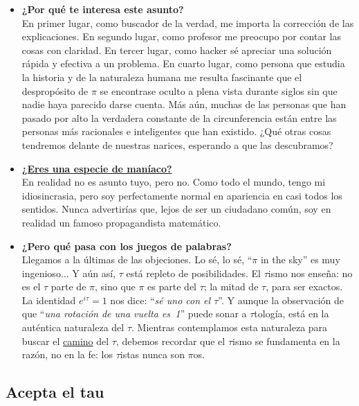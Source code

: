 \begin{itemize}
  \item \textbf{¿Por qué te interesa este asunto?} \\ En primer lugar, como buscador de la verdad, me importa la corrección de las explicaciones. En segundo lugar, como profesor me preocupo por contar las cosas con claridad. En tercer lugar, como hacker sé apreciar una solución rápida y efectiva a un problema. En cuarto lugar, como persona que estudia la historia y de la naturaleza humana me resulta fascinante que el despropósito de $\pi$ se encontrase oculto a plena vista durante siglos sin que nadie haya parecido darse cuenta. Más aún, muchas de las personas que han pasado por alto la verdadera constante de la circunferencia están entre las personas más racionales e inteligentes que han existido. ¿Qué otras cosas tendremos delante de nuestras narices, esperando a que las descubramos?


  \item \href{https://youtube.com/clip/UgkxgkaP4J9lCZ8Yjd7Fe9iLGDHYfd9anfR1}{\textbf{¿Eres una especie de maníaco?}} \\ En realidad no es asunto tuyo, pero no. Como todo el mundo, tengo mi idiosincrasia, pero soy perfectamente normal en apariencia en casi todos los sentidos. Nunca advertirías que, lejos de ser un ciudadano común, soy en realidad un famoso propagandista matemático.


  \item \textbf{¿Pero qué pasa con los juegos de palabras?} \\ Llegamos a la últimas de las objeciones. Lo sé, lo sé, ``$\pi$ in the sky'' es muy ingenioso$\ldots$ Y aún así, $\tau$ está repleto de posibilidades. El $\tau$ismo nos enseña: no es el $\tau$ parte de $\pi$, sino que $\pi$ es parte del $\tau$; la mitad de $\tau$, para ser exactos. La identidad $e^{i\tau} = 1$ nos dice: ``\emph{sé uno con el $\tau$}''. Y aunque la observación de que ``\emph{una rotación de una vuelta es~1}'' puede sonar a $\tau$tología, está en la auténtica naturaleza del $\tau$. Mientras contemplamos esta naturaleza para buscar el \href{https://es.wikipedia.org/wiki/Tao}{camino} del $\tau$, debemos recordar que el $\tau$ismo se fundamenta en la razón, no en la fe: los $\tau$istas nunca son $\pi$os.


\end{itemize}


  \subsection{Acepta el tau} %
  \label{sec:embrace_the_tau}

